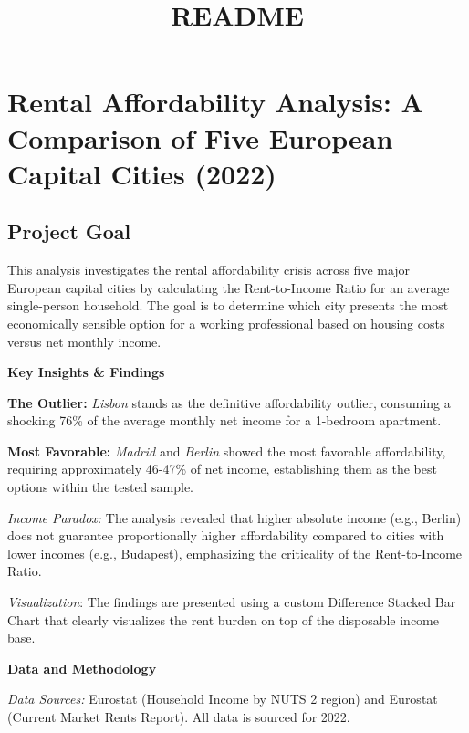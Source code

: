 \documentclass[
]{article}
\title{README}
\author{}
\date{\vspace{-2.5em}}
\begin{document}
\maketitle

\section{\texorpdfstring{\textbf{Rental Affordability Analysis: A
Comparison of Five European Capital Cities
(2022)}}{Rental Affordability Analysis: A Comparison of Five European Capital Cities (2022)}}\label{rental-affordability-analysis-a-comparison-of-five-european-capital-cities-2022}

\subsection{Project Goal}\label{project-goal}

This analysis investigates the rental affordability crisis across five
major European capital cities by calculating the Rent-to-Income Ratio
for an average single-person household. The goal is to determine which
city presents the most economically sensible option for a working
professional based on housing costs versus net monthly income.

\textbf{Key Insights \& Findings}

\textbf{The Outlier:} \emph{Lisbon} stands as the definitive
affordability outlier, consuming a shocking 76\% of the average monthly
net income for a 1-bedroom apartment.

\textbf{Most Favorable:} \emph{Madrid} and \emph{Berlin} showed the most
favorable affordability, requiring approximately 46-47\% of net income,
establishing them as the best options within the tested sample.

\emph{Income Paradox:} The analysis revealed that higher absolute income
(e.g., Berlin) does not guarantee proportionally higher affordability
compared to cities with lower incomes (e.g., Budapest), emphasizing the
criticality of the Rent-to-Income Ratio.

\emph{Visualization}: The findings are presented using a custom
Difference Stacked Bar Chart that clearly visualizes the rent burden on
top of the disposable income base.

\textbf{Data and Methodology}

\emph{Data Sources:} Eurostat (Household Income by NUTS 2 region) and
Eurostat (Current Market Rents Report). All data is sourced for 2022.
\end{document}
